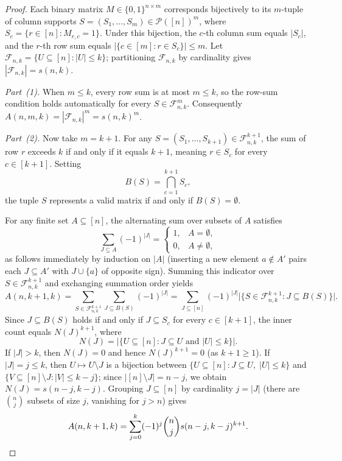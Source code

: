 \documentclass[11pt]{article}
\begin{document}
\begin{proof}
Each binary matrix $M \in \{0, 1\}^{n \times m}$ corresponds bijectively to its $m$-tuple of column supports $S = (S_1, \dots, S_m) \in \mathcal{P}([n])^m$, where $S_c = \{r \in [n] : M_{r, c} = 1\}$. Under this bijection, the $c$-th column sum equals $|S_c|$, and the $r$-th row sum equals $|\{c \in [m] : r \in S_c\}| \le m$. Let $\mathcal{F}_{n, k} = \{U \subseteq [n] : |U| \le k\}$; partitioning $\mathcal{F}_{n, k}$ by cardinality gives $|\mathcal{F}_{n, k}| = s(n, k)$.

\emph{Part~(1).} When $m \le k$, every row sum is at most $m \le k$, so the row-sum condition holds automatically for every $S \in \mathcal{F}_{n, k}^m$. Consequently $A(n, m, k) = |\mathcal{F}_{n, k}|^m = s(n, k)^m$.

\emph{Part~(2).} Now take $m = k + 1$. For any $S = (S_1, \dots, S_{k+1}) \in \mathcal{F}_{n, k}^{k+1}$, the sum of row $r$ exceeds $k$ if and only if it equals $k + 1$, meaning $r \in S_c$ for every $c \in [k + 1]$. Setting
\[
  B(S) = \bigcap_{c=1}^{k+1} S_c,
\]
the tuple $S$ represents a valid matrix if and only if $B(S) = \emptyset$.

For any finite set $A \subseteq [n]$, the alternating sum over subsets of $A$ satisfies
\[
  \sum_{J \subseteq A} (-1)^{|J|} = \begin{cases} 1, & A = \emptyset, \\ 0, & A \ne \emptyset, \end{cases}
\]
as follows immediately by induction on $|A|$ (inserting a new element $a \notin A'$ pairs each $J \subseteq A'$ with $J \cup \{a\}$ of opposite sign). Summing this indicator over $S \in \mathcal{F}_{n, k}^{k+1}$ and exchanging summation order yields
\[
  A(n, k + 1, k) = \sum_{S \in \mathcal{F}_{n, k}^{k+1}} \sum_{J \subseteq B(S)} (-1)^{|J|} = \sum_{J \subseteq [n]} (-1)^{|J|} \bigl|\{S \in \mathcal{F}_{n, k}^{k+1} : J \subseteq B(S)\}\bigr|.
\]
Since $J \subseteq B(S)$ holds if and only if $J \subseteq S_c$ for every $c \in [k + 1]$, the inner count equals $N(J)^{k+1}$, where
\[
  N(J) = \bigl|\{U \subseteq [n] : J \subseteq U \text{ and } |U| \le k\}\bigr|.
\]
If $|J| > k$, then $N(J) = 0$ and hence $N(J)^{k+1} = 0$ (as $k + 1 \ge 1$). If $|J| = j \le k$, then $U \mapsto U \setminus J$ is a bijection between $\{U \subseteq [n] : J \subseteq U,\; |U| \le k\}$ and $\{V \subseteq [n] \setminus J : |V| \le k - j\}$; since $|[n] \setminus J| = n - j$, we obtain $N(J) = s(n - j, k - j)$. Grouping $J \subseteq [n]$ by cardinality $j = |J|$ (there are $\binom{n}{j}$ subsets of size $j$, vanishing for $j > n$) gives
\[
  A(n, k + 1, k) = \sum_{j=0}^{k} (-1)^j \binom{n}{j} s(n - j, k - j)^{k + 1}. \qedhere
\]
\end{proof}
\end{document}
